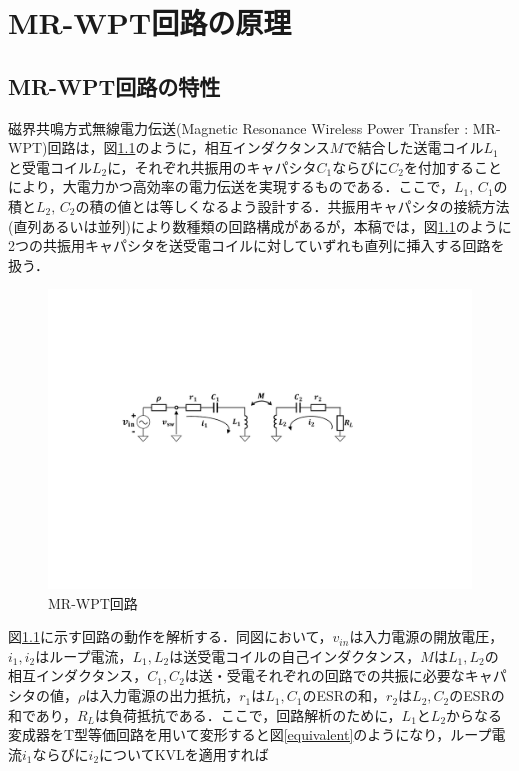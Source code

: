 \chapter{MR-WPT回路の原理}
\section{MR-WPT回路の特性}
磁界共鳴方式無線電力伝送(Magnetic Resonance Wireless Power Transfer : MR-WPT)回路は，図\ref{mr-wpt}のように，相互インダクタンス$M$で結合した送電コイル$L_1$と受電コイル$L_2$に，それぞれ共振用のキャパシタ$C_1$ならびに$C_2$を付加することにより，大電力かつ高効率の電力伝送を実現するものである\cite{Imura2017}．ここで，$L_1, \, C_1$の積と$L_2, \, C_2$の積の値とは等しくなるよう設計する．共振用キャパシタの接続方法(直列あるいは並列)により数種類の回路構成があるが，本稿では，図\ref{mr-wpt}のように2つの共振用キャパシタを送受電コイルに対していずれも直列に挿入する回路を扱う．\par 

\begin{figure}[b]
\begin{center}

\includegraphics[width=130mm]{figures/mr-wpt.pdf}
\caption{MR-WPT回路}
\label{mr-wpt}
\end{center}

\end{figure}

図\ref{mr-wpt}に示す回路の動作を解析する．同図において，$v_{in}$は入力電源の開放電圧，$i_1,i_2$はループ電流，$L_1,L_2$は送受電コイルの自己インダクタンス，$M$は$L_1,L_2$の相互インダクタンス，$C_1,C_2$は送・受電それぞれの回路での共振に必要なキャパシタの値，$\rho$は入力電源の出力抵抗，$r_1$は$L_1,C_1$のESRの和，$r_2$は$L_2,C_2$のESRの和であり，$R_L$は負荷抵抗である．ここで，回路解析のために，$L_1$と$L_2$からなる変成器をT型等価回路を用いて変形すると図\ref{equivalent}のようになり，ループ電流$i_1$ならびに$i_2$についてKVLを適用すれば


